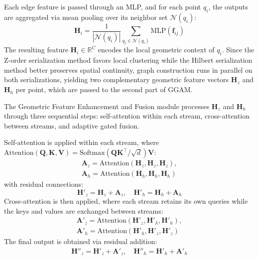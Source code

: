 \documentclass[a4paper,fleqn]{cas-dc}
\begin{document}
Each edge feature is passed through an MLP, and for each point $q_i$, the outputs are aggregated via mean pooling over its neighbor set $\mathcal{N}(q_i)$:
\begin{equation}
\mathbf{H}_i = \frac{1}{|\mathcal{N}(q_i)|} \sum_{q_j \in \mathcal{N}(q_i)} \text{MLP}(\mathbf{f}_{ij})
\end{equation}
The resulting feature $\mathbf{H}_i \in \mathbb{R}^C$ encodes the local geometric context of $q_i$. Since the Z-order serialization method favors local clustering while the Hilbert serialization method better preserves spatial continuity, graph construction runs in parallel on both serializations, yielding two complementary geometric feature vectors $\mathbf{H}_z$ and $\mathbf{H}_h$ per point, which are passed to the second part of GGAM.

The Geometric Feature Enhancement and Fusion module processes $\mathbf{H}_z$ and $\mathbf{H}_h$ through three sequential steps: self-attention within each stream, cross-attention between streams, and adaptive gated fusion.

Self-attention is applied within each stream, where $\text{Attention}(\mathbf{Q}, \mathbf{K}, \mathbf{V}) = \text{Softmax}(\mathbf{Q}\mathbf{K}^\top / \sqrt{d})\mathbf{V}$:
\begin{equation}
\begin{aligned}
\mathbf{A}_z = \text{Attention}(\mathbf{H}_z, \mathbf{H}_z, \mathbf{H}_z), \\
\mathbf{A}_h = \text{Attention}(\mathbf{H}_h, \mathbf{H}_h, \mathbf{H}_h)
\end{aligned}
\end{equation}
with residual connections:
\begin{equation}
\mathbf{H}'_z = \mathbf{H}_z + \mathbf{A}_z, \quad \mathbf{H}'_h = \mathbf{H}_h + \mathbf{A}_h
\end{equation}
Cross-attention is then applied, where each stream retains its own queries while the keys and values are exchanged between streams:
\begin{equation}
\begin{aligned}
\mathbf{A}'_z = \text{Attention}(\mathbf{H}'_z, \mathbf{H}'_h, \mathbf{H}'_h), \\
\mathbf{A}'_h = \text{Attention}(\mathbf{H}'_h, \mathbf{H}'_z, \mathbf{H}'_z)
\end{aligned}
\end{equation}
The final output is obtained via residual addition:
\begin{equation}
\begin{aligned}
\mathbf{H}''_z = \mathbf{H}'_z + \mathbf{A}'_z, \quad \mathbf{H}''_h = \mathbf{H}'_h + \mathbf{A}'_h
\end{aligned}
\end{equation}
\end{document}
